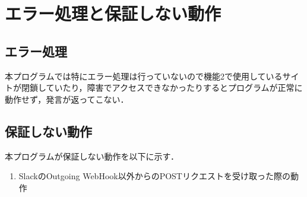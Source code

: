 \documentclass[12pt]{jsarticle}
\begin{document}
\section{エラー処理と保証しない動作}
\subsection{エラー処理}
本プログラムでは特にエラー処理は行っていないので機能2で使用しているサイトが閉鎖していたり，障害でアクセスできなかったりするとプログラムが正常に動作せず，発言が返ってこない．

\subsection{保証しない動作}
本プログラムが保証しない動作を以下に示す．
\begin{enumerate}
\item SlackのOutgoing WebHook以外からのPOSTリクエストを受け取った際の動作
\end{enumerate}



\end{document}
